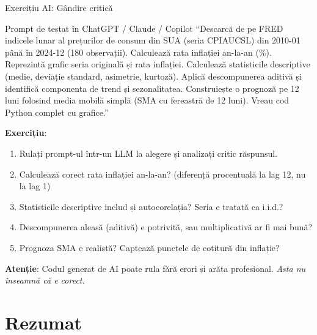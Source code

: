 \documentclass[9pt, aspectratio=169, t]{beamer}
\begin{document}
\begin{frame}{Exercițiu AI: Gândire critică}
    \vspace{-3mm}
    \begin{block}{\footnotesize Prompt de testat în ChatGPT / Claude / Copilot}
        {\footnotesize
        ``Descarcă de pe FRED indicele lunar al prețurilor de consum din SUA (seria CPIAUCSL) din 2010-01 până în 2024-12 (180 observații). Calculează rata inflației an-la-an (\%). Reprezintă grafic seria originală și rata inflației. Calculează statisticile descriptive (medie, deviație standard, asimetrie, kurtoză). Aplică descompunerea aditivă și identifică componenta de trend și sezonalitatea. Construiește o prognoză pe 12 luni folosind media mobilă simplă (SMA cu fereastră de 12 luni). Vreau cod Python complet cu grafice.''
        }
    \end{block}
    \vspace{-2mm}
    {\footnotesize
    \textbf{Exercițiu}:
    \begin{enumerate}\setlength{\itemsep}{0pt}
        \item Rulați prompt-ul într-un LLM la alegere și analizați critic răspunsul.
        \item Calculează corect rata inflației an-la-an? (diferență procentuală la lag 12, nu la lag 1)
        \item Statisticile descriptive includ și autocorelația? Seria e tratată ca i.i.d.?
        \item Descompunerea aleasă (aditivă) e potrivită, sau multiplicativă ar fi mai bună?
        \item Prognoza SMA e realistă? Captează punctele de cotitură din inflație?
    \end{enumerate}
    }
    \vspace{-2mm}
    \begin{alertblock}{}
        {\footnotesize \textbf{Atenție}: Codul generat de AI poate rula fără erori și arăta profesional. \textit{Asta nu înseamnă că e corect.}}
    \end{alertblock}
\end{frame}

\section{Rezumat}
\end{document}
